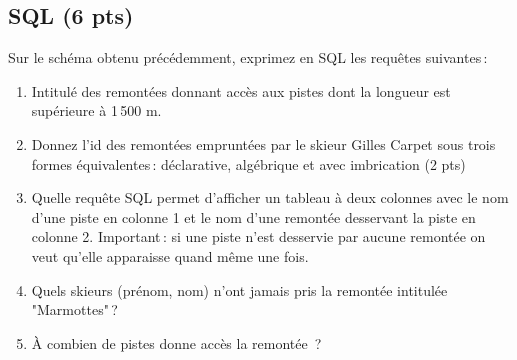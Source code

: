 \subsection*{SQL (6 pts)}

Sur le schéma obtenu précédemment, exprimez en SQL les requêtes suivantes\,:

\begin{enumerate}
   \item Intitulé des remontées donnant accès aux pistes dont la longueur est 
         supérieure à 1\,500 m. 

  \item Donnez l'id des remontées empruntées par le skieur Gilles Carpet
  sous trois formes équivalentes\,: 
     déclarative, algébrique et avec imbrication (2 pts)
 
  \item Quelle requête SQL permet d'afficher un tableau à deux colonnes
     avec le nom d'une piste en colonne 1 et le nom d'une remontée
     desservant la piste en colonne 2. Important\,: si une piste
     n'est desservie par aucune remontée on veut qu'elle apparaisse quand 
     même une fois.  
      
   \item Quels skieurs (prénom, nom) n'ont jamais pris la remontée intitulée "Marmottes"\,?

   \item À combien de pistes donne accès la remontée  \,?

 
\end{enumerate}


